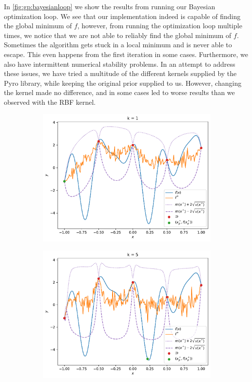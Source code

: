 In \cref{fig:gp:bayesianloop} we show the results from running our Bayesian optimization loop. We see that our implementation indeed is capable of finding the global minimum of $f$,
however, from running the optimization loop multiple times, we notice that we are not able to reliably find the global minimum of $f$. Sometimes the algorithm gets stuck in a local minimum and is never able to escape. This even happens from the first iteration in some cases. Furthermore, we also have intermittent numerical stability problems. In an attempt to address these issues, we have tried a multitude of the different kernels supplied by the Pyro library, while keeping the original prior supplied to us. However, changing the kernel made no difference, and in some cases led to worse results than we observed with the RBF kernel.

\begin{figure}[H]
    \begin{subfigure}[t]{0.49\textwidth}
        \centering
        \includegraphics[width=\textwidth]{figures/gp/b2-k_1.pdf}
    \end{subfigure}
    \hfill
    \begin{subfigure}[t]{0.49\textwidth}
        \centering
        \includegraphics[width=\textwidth]{figures/gp/b2-k_5.pdf}
    \end{subfigure}


\end{figure}
